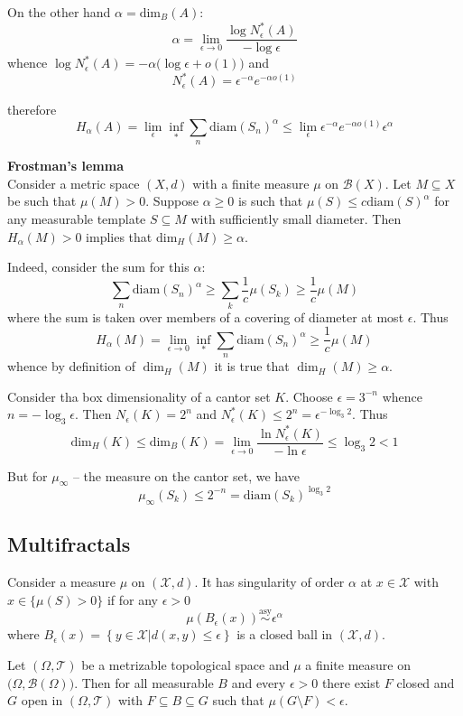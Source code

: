 \documentclass[a4paper]{article}
\newcommand{\obj}[1]{{\left\{ #1 \right \}}}
\newcommand{\induc}[1]{{\left . #1 \right \vert}}
\newcommand{\Xcal}{\mathcal{X}}
\newcommand{\Tcal}{\mathcal{T}}
\newcommand{\borel}{\mathcal{B}}
\begin{document}
On the other hand $\alpha = \text{dim}_B(A)$:
\[\alpha = \lim_{\epsilon\to 0}\frac{\log N^*_\epsilon(A)}{-\log \epsilon}\]
whence $\log N^*_\epsilon(A) = -\alpha \big(\log \epsilon + o(1)\big)$
and
\[N^*_\epsilon(A) = \epsilon^{-\alpha}e^{-\alpha o(1)}\]

therefore
\[H_\alpha(A) = \lim_{\epsilon} \inf_{*} \sum_n \text{diam}(S_n)^\alpha \leq \lim_{\epsilon} \epsilon^{-\alpha}e^{-\alpha o(1)} \epsilon^\alpha \]


\noindent\textbf{Frostman's lemma}\hfill\\
Consider a metric space $(X,d)$ with a finite measure $\mu$ on $\mathcal{B}(X)$. Let $M\subseteq X$ be such that $\mu(M) > 0$. Suppose $\alpha\geq 0$ is such that $\mu(S) \leq c \text{diam}(S)^\alpha$ for any measurable template $S\subseteq M$ with sufficiently small diameter. Then $H_\alpha(M)>0$ implies that $\text{dim}_H(M) \geq \alpha$.

Indeed, consider the sum for this $\alpha$:
\[\sum_n \text{diam}(S_n)^\alpha \geq \sum_k \frac{1}{c} \mu(S_k) \geq \frac{1}{c} \mu(M)\]
where the sum is taken over members of a covering of diameter at most $\epsilon$. Thus
\[H_\alpha(M) = \lim_{\epsilon\to 0}\inf_* \sum_n \text{diam}(S_n)^\alpha \geq \frac{1}{c} \mu(M)\]
whence by definition of $\dim_H(M)$ it is true that $\dim_H(M) \geq \alpha$.


Consider tha box dimensionality of a cantor set $K$.
Choose $\epsilon = 3^{-n}$ whence $n=-\log_3 \epsilon$. Then $N_\epsilon(K) = 2^n$ and $N_\epsilon^*(K) \leq 2^n = \epsilon^{-\log_3 2}$. Thus
\[\text{dim}_H(K) \leq \text{dim}_B(K) = \lim_{\epsilon\to 0}\frac{\ln N_\epsilon^*(K)}{-\ln \epsilon}\leq \log_3 2 < 1\]

But for $\mu_\infty$ -- the measure on the cantor set, we have 
\[\mu_\infty(S_k) \leq 2^{-n} = \text{diam}(S_k)^{\log_3 2}\]

\subsection{Multifractals} %
\label{sub:multifractals}

Consider a measure $\mu$ on $(\Xcal, d)$. It has singularity of order $\alpha$ at $x\in \Xcal$ with $x\in \{\mu(S)>0\}$ if for any $\epsilon>0$
\[\mu(B_\epsilon(x)) \overset{\text{asy}}{\sim} \epsilon^\alpha\]
where $B_\epsilon(x) = \obj{\induc{y\in \Xcal}d(x,y)\leq\epsilon}$ is a closed ball in $(\Xcal, d)$.

Let $(\Omega, \Tcal)$ be a metrizable topological space and $\mu$ a finite measure on $\big(\Omega, \borel(\Omega)\big)$. Then for all measurable $B$ and every $\epsilon>0$ there exist $F$ closed and $G$ open in $(\Omega, \Tcal)$ with $F\subseteq B \subseteq G$ such that $\mu(G\setminus F) < \epsilon$.
\end{document}
